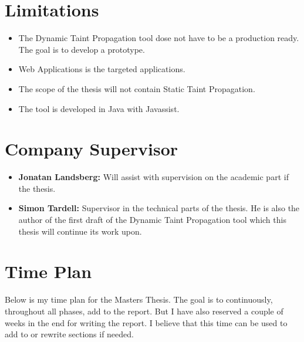 \documentclass{../kththesis}
\begin{document}
\section{Limitations}
\begin{itemize}  
	\item The Dynamic Taint Propagation tool dose not have to be a production ready. The goal is to develop a prototype.
	\item Web Applications is the targeted applications.
	\item The scope of the thesis will not contain Static Taint Propagation.
	\item The tool is developed in Java with Javassist.
\end{itemize}


\section{Company Supervisor}
\begin{itemize}
	\item \textbf{Jonatan Landsberg:} Will assist with supervision on the academic part if the thesis.
	\item \textbf{Simon Tardell:} Supervisor in the technical parts of the thesis. He is also the author of the first draft of the Dynamic Taint Propagation tool which this thesis will continue its work upon. 
\end{itemize}


\section{Time Plan}
Below is my time plan for the Masters Thesis. The goal is to continuously, throughout all phases, add to the report. But I have also reserved a couple of weeks in the end for writing the report. I believe that this time can be used to add to or rewrite sections if needed. \\ \\
\end{document}

